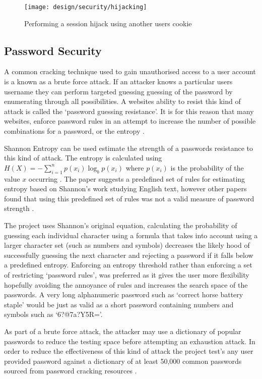 \begin{figure}[h]
    \centering
    \texttt{[image: design/security/hijacking]}
    \caption{Performing a session hijack using another users cookie \parencite{owasp2011sessionhihacking}}
    \label{fig:securityhijacking}
\end{figure}

\subsection{Password Security}

A common cracking technique used to gain unauthorised access to a user account is a known as a brute force attack. If an attacker knows a particular users username they can perform targeted guessing guessing of the password by enumerating through all possibilities. A websites ability to resist this kind of attack is called the `password guessing resistance'. It is for this reason that many websites, enforce password rules in an attempt to increase the number of possible combinations for a password, or the entropy \cite{helkala2008authentication}.

Shannon Entropy can be used estimate the strength of a passwords resistance to this kind of attack. The entropy is calculated using $H(X)= -\sum_{i=1}^n{p(x_i)\log_b p(x_i)}$ where $p(x_i)$ is the probability of the value $x$ occurring \cite{burr2013electronic}.
%
The paper suggests a predefined set of rules for estimating entropy based on Shannon's work studying English text, however other papers found that using this predefined set of rules was not a valid measure of password strength \cite{weir2010shannon}.
 
The project uses Shannon's original equation, calculating the probability of guessing each individual character using a formula that takes into account using a larger character set (such as numbers and symbols) decreases the likely hood of successfully guessing the next character and rejecting a password if it falls below a predefined entropy.
%
Enforcing an entropy threshold rather than enforcing a set of restricting `password rules', was preferred as it gives the user more flexibility hopefully avoiding the annoyance of rules and increases the search space of the passwords. A very long alphanumeric password such as `correct horse battery staple' would be just as valid as a short password containing numbers and symbols such as `6?@7a?Y5R='.

As part of a brute force attack, the attacker may use a dictionary of popular passwords to reduce the testing space before attempting an exhaustion attack.
%
In order to reduce the effectiveness of this kind of attack the project test's any user provided password against a dictionary of at least 50,000 common passwords sourced from password cracking resources \cite{burr2013electronic}.

